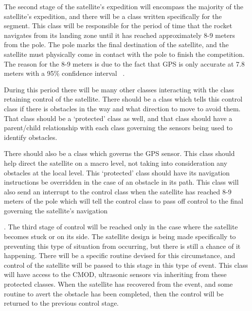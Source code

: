 \documentclass[10pt,letterpaper,onecolumn,journal]{IEEEtran}
\begin{document}
\par
The second stage of the satellite's expedition will encompass the majority of the satellite's expedition, and there will be a class written specifically for the segment. This class will be responsible for the period of time that the rocket navigates from its landing zone until it has reached approximately 8-9 meters from the pole. The pole marks the final destination of the satellite, and the satellite must physically come in contact with the pole to finish the competition. The reason for the 8-9 meters is due to the fact that GPS is only accurate at 7.8 meters with a 95\% confidence interval ~\cite{gov2016}.\vspace{.3cm}
\par
During this period there will be many other classes interacting with the class retaining control of the satellite. There should be a class which tells this control class if there is obstacles in the way and what direction to move to avoid them. That class should be a ‘protected’ class as well, and that class should have a parent/child relationship with each class governing the sensors being used to identify obstacles.\vspace{.3cm}
\par 
There should also be a class which governs the GPS sensor. This class should help direct the satellite on a macro level, not taking into consideration any obstacles at the local level. This ‘protected’ class should have its navigation instructions be overridden in the case of an obstacle in its path. This class will also send an interrupt to the control class when the satellite has reached 8-9 meters of the pole which will tell the control class to pass off control to the final governing the satellite's navigation\vspace{.3cm}
\par.
The third stage of control will be reached only in the case where the satellite becomes stuck or on its side. The satellite design is being made specifically to preventing this type of situation from occurring, but there is still a chance of it happening. There will be a specific routine devised for this circumstance, and control of the satellite will be passed to this stage in this type of event. This class will have access to the CMOD, ultrasonic sensors via inheriting from these protected classes. When the satellite has recovered from the event, and some routine to avert the obstacle has been completed, then the control will be returned to the previous control stage.\vspace{.3cm}
\end{document}
